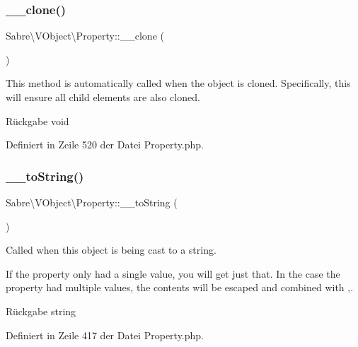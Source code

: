 \subsubsection{\texorpdfstring{\+\_\+\+\_\+clone()}{\_\_clone()}}
{\footnotesize\ttfamily Sabre\textbackslash{}\+V\+Object\textbackslash{}\+Property\+::\+\_\+\+\_\+clone (\begin{DoxyParamCaption}{ }\end{DoxyParamCaption})}

This method is automatically called when the object is cloned. Specifically, this will ensure all child elements are also cloned.

\begin{DoxyReturn}{Rückgabe}
void 
\end{DoxyReturn}


Definiert in Zeile 520 der Datei Property.\+php.

\mbox{\label{class_sabre_1_1_v_object_1_1_property_a5063d0244366177e9f3fe66f57d30811}} 
\subsubsection{\texorpdfstring{\+\_\+\+\_\+to\+String()}{\_\_toString()}}
{\footnotesize\ttfamily Sabre\textbackslash{}\+V\+Object\textbackslash{}\+Property\+::\+\_\+\+\_\+to\+String (\begin{DoxyParamCaption}{ }\end{DoxyParamCaption})}

Called when this object is being cast to a string.

If the property only had a single value, you will get just that. In the case the property had multiple values, the contents will be escaped and combined with ,.

\begin{DoxyReturn}{Rückgabe}
string 
\end{DoxyReturn}


Definiert in Zeile 417 der Datei Property.\+php.

\mbox{\label{class_sabre_1_1_v_object_1_1_property_a7bd4f6607335ccbe5edd84c804eb523c}} 
